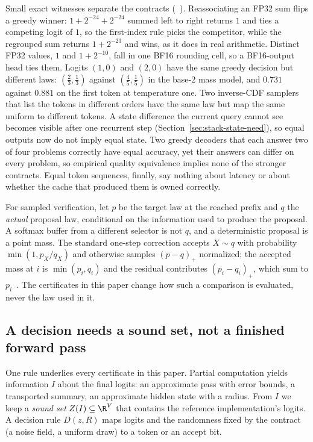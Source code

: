 Small exact witnesses separate the contracts (~). Reassociating an FP32 sum flips a greedy winner: $1+2^{-24}+2^{-24}$ summed left to right returns $1$ and ties a competing logit of $1$, so the first-index rule picks the competitor, while the regrouped sum returns $1+2^{-23}$ and wins, as it does in real arithmetic. Distinct FP32 values, $1$ and $1+2^{-10}$, fall in one BF16 rounding cell, so a BF16-output head ties them. Logits $(1,0)$ and $(2,0)$ have the same greedy decision but different laws: $(\tfrac23,\tfrac13)$ against $(\tfrac45,\tfrac15)$ in the base-2 mass model, and $0.731$ against $0.881$ on the first token at temperature one. Two inverse-CDF samplers that list the tokens in different orders have the same law but map the same uniform to different tokens. A state difference the current query cannot see becomes visible after one recurrent step (Section~\ref{sec:stack-state-need}), so equal outputs now do not imply equal state. Two greedy decoders that each answer two of four problems correctly have equal accuracy, yet their answers can differ on every problem, so empirical quality equivalence implies none of the stronger contracts. Equal token sequences, finally, say nothing about latency or about whether the cache that produced them is owned correctly.

For sampled verification, let $p$ be the target law at the reached prefix and $q$ the \emph{actual} proposal law, conditional on the information used to produce the proposal. A softmax buffer from a different selector is not $q$, and a deterministic proposal is a point mass. The standard one-step correction accepts $X\sim q$ with probability $\min(1,p_X/q_X)$ and otherwise samples $(p-q)_+$ normalized; the accepted mass at $i$ is $\min(p_i,q_i)$ and the residual contributes $(p_i-q_i)_+$, which sum to $p_i$~\cite{specdecode}. The certificates in this paper change how such a comparison is evaluated, never the law used in it.

\subsection{A decision needs a sound set, not a finished forward pass}\label{sec:commit}
One rule underlies every certificate in this paper. Partial computation yields information $I$ about the final logits: an approximate pass with error bounds, a transported summary, an approximate hidden state with a radius. From $I$ we keep a \emph{sound set} $Z(I)\subseteq\R^V$ that contains the reference implementation's logits. A decision rule $D(z,R)$ maps logits and the randomness fixed by the contract (a noise field, a uniform draw) to a token or an accept bit.

